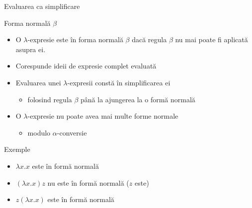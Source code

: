 \documentclass[xcolor=pdftex,romanian,colorlinks]{beamer}
\begin{document}
\begin{frame}{Evaluarea ca simplificare}
\protect\hypertarget{evaluarea-ca-simplificare}{}

\begin{block}{Forma normală \(\beta\)}

\begin{itemize}

\item
  O \(\lambda\)-expresie este în forma normală \(\beta\) dacă regula
  \(\beta\) nu mai poate fi aplicată asupra ei.
\item
  Corespunde ideii de expresie complet evaluată
\item
  Evaluarea unei \(\lambda\)-expresii constă în simplificarea ei

  \begin{itemize}
  
  \item
    folosind regula \(\beta\) până la ajungerea la o formă normală
  \end{itemize}
\item
  O \(\lambda\)-expresie nu poate avea mai multe forme normale

  \begin{itemize}
  
  \item
    modulo \(\alpha\)-conversie
  \end{itemize}
\end{itemize}

\end{block}

\begin{block}{Exemple}

\begin{itemize}

\item
  \(\lambda x . x\) este în formă normală
\item
  \((\lambda x .x ) z\) nu este în formă normală (\(z\) este)
\item
  \(z (\lambda x .x )\) este în formă normală
\end{itemize}

\end{block}

\end{frame}
\end{document}
